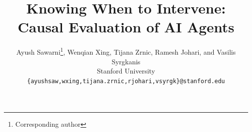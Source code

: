 \documentclass[11pt]{article}
\title{Knowing When to Intervene: Causal Evaluation of AI Agents}
\author{
   Ayush Sawarni\footnote{Corresponding author}, Wenqian Xing, Tijana Zrnic, Ramesh Johari, and Vasilis Syrgkanis\\[0.5em]
  Stanford University\\[0.2em]
  \texttt{\{ayushsaw,wxing,tijana.zrnic,rjohari,vsyrgk\}@stanford.edu}
}
\date{}
\newcommand{\ayush}[1]{\textcolor{cyan}{Ayush:#1}}
\begin{document}
\maketitle






\label{page:main-end}


\clearpage
\begingroup
\small\raggedright


\endgroup

\clearpage
\appendix





% 
\label{page:document-end}
\end{document}
